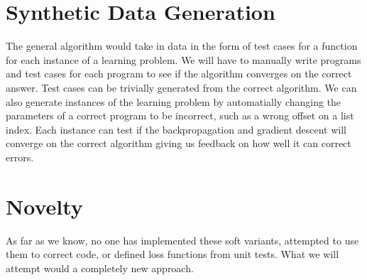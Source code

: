 \documentclass{article}
\begin{document}
\section*{Synthetic Data Generation}
The general algorithm would take in data in the form of test cases for a function for each instance of a learning problem. We will have to manually write programs and test cases for each program to see if the algorithm converges on the correct answer. Test cases can be trivially generated from the correct algorithm. We can also generate instances of the learning problem by automatially changing the parameters of a correct program to be incorrect, such as a wrong offset on a list index. Each instance can test if the backpropagation and gradient descent will converge on the correct algorithm giving us feedback on how well it can correct errors.
\section*{Novelty}
As far as we know, no one has implemented these soft variants, attempted to use them to correct code, or defined loss functions from unit tests. What we will attempt would a completely new approach.
\end{document}
